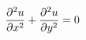 \documentclass[preview]{standalone}
\begin{document}
\begin{align*}
\special{dvisvgm:raw <g id='unique000'>}\frac{\partial^2 u}{\partial x^2} + \frac{\partial^2 u}{\partial y^2} = 0\special{dvisvgm:raw </g>}
\end{align*}
\end{document}
